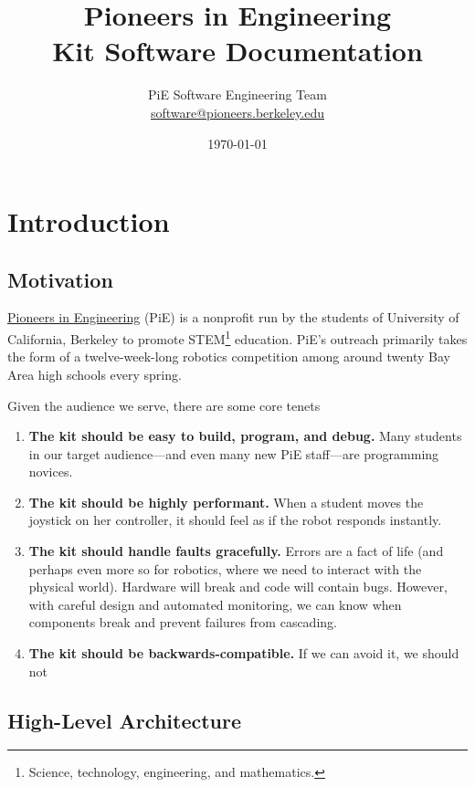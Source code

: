 \documentclass[12pt]{book}
\title{Pioneers in Engineering \\ Kit Software Documentation}
\author{PiE Software Engineering Team \\ \url{software@pioneers.berkeley.edu}}
\date{\today}
\begin{document}
  \frontmatter
  \maketitle
  \tableofcontents

  \mainmatter

  \chapter{Introduction}

  \section{Motivation}

  \href{https://pierobotics.org}{Pioneers in Engineering} (PiE) is a nonprofit run by the students of University of California, Berkeley to promote STEM\footnote{Science, technology, engineering, and mathematics.} education.
  PiE's outreach primarily takes the form of a twelve-week-long robotics competition among around twenty Bay Area high schools every spring.

  Given the audience we serve, there are some core tenets

  \begin{enumerate}
    \item
      \textbf{The kit should be easy to build, program, and debug.}
      Many students in our target audience---and even many new PiE staff---are programming novices.

    \item
      \textbf{The kit should be highly performant.}
      When a student moves the joystick on her controller, it should feel as if the robot responds instantly.

    \item
      \textbf{The kit should handle faults gracefully.}
      Errors are a fact of life (and perhaps even more so for robotics, where we need to interact with the physical world).
      Hardware will break and code will contain bugs.
      However, with careful design and automated monitoring, we can know when components break and prevent failures from cascading.

    \item
      \textbf{The kit should be backwards-compatible.}
      If we can avoid it, we should not
  \end{enumerate}

  \section{High-Level Architecture}
\end{document}
